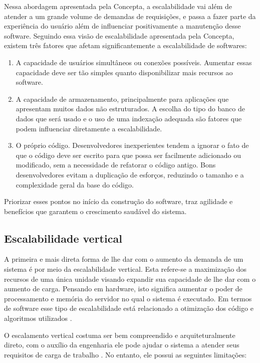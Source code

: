 Nessa abordagem apresentada pela Concepta, a escalabilidade vai além de atender
a um grande volume de demandas de requisições, e passa a fazer parte da
experiência do usuário além de influenciar positivamente a manutenção desse
software. Seguindo essa visão de escalabilidade apresentada pela Concepta,
existem três fatores que afetam significantemente a escalabilidade de softwares:

  \begin{enumerate}
    \item A capacidade de usuários simultâneos ou conexões possíveis.
    Aumentar essas capacidade deve ser tão simples quanto disponibilizar mais
    recursos ao software.
    \item A capacidade de armazenamento, principalmente para aplicações
    que apresentam muitos dados não estruturados. A escolha do tipo do banco de
    dados que será usado e o uso de uma indexação adequada são fatores que
    podem influenciar diretamente a escalabilidade.
    \item O próprio código. Desenvolvedores inexperientes tendem a ignorar
    o fato de que o código deve ser escrito para que possa ser facilmente
    adicionado ou modificado, sem a necessidade de refatorar o código antigo.
    Bons desenvolvedores evitam a duplicação de esforços, reduzindo o tamanho
    e a complexidade geral da base do código.
  \end{enumerate}

Priorizar esses pontos no início da construção do software, traz agilidade e
benefícios que garantem o crescimento saudável do sistema.

\subsection{Escalabilidade vertical}

A primeira e mais direta forma de lhe dar com o aumento da demanda de um
sistema é por meio da escalabilidade vertical. Esta refere-se a maximização
dos recursos de uma única unidade visando expandir sua capacidade de lhe dar
com o aumento de carga.  Pensando em hardware, isto significa aumentar o poder
de processamento e memória do servidor no qual o sistema é executado. Em termos
de software esse tipo de escalabilidade está relacionado a otimização dos código
e algoritmos utilizados \cite{FreshGuide2012}.

O escalamento vertical costuma ser bem compreendido e arquiteturalmente direto,
com o auxílio da engenharia ele pode ajudar o sistema a atender seus requisitos
de carga de trabalho \cite{InterSystems2019}. No entanto, ele possui as seguintes
limitações:

